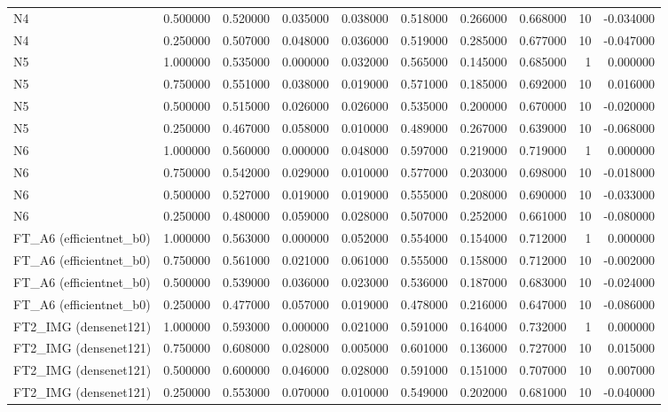 \begin{table}
\begin{tabular}{lrrrrrrrrr}
N4 & 0.500000 & 0.520000 & 0.035000 & 0.038000 & 0.518000 & 0.266000 & 0.668000 & 10 & -0.034000 \\
N4 & 0.250000 & 0.507000 & 0.048000 & 0.036000 & 0.519000 & 0.285000 & 0.677000 & 10 & -0.047000 \\
N5 & 1.000000 & 0.535000 & 0.000000 & 0.032000 & 0.565000 & 0.145000 & 0.685000 & 1 & 0.000000 \\
N5 & 0.750000 & 0.551000 & 0.038000 & 0.019000 & 0.571000 & 0.185000 & 0.692000 & 10 & 0.016000 \\
N5 & 0.500000 & 0.515000 & 0.026000 & 0.026000 & 0.535000 & 0.200000 & 0.670000 & 10 & -0.020000 \\
N5 & 0.250000 & 0.467000 & 0.058000 & 0.010000 & 0.489000 & 0.267000 & 0.639000 & 10 & -0.068000 \\
N6 & 1.000000 & 0.560000 & 0.000000 & 0.048000 & 0.597000 & 0.219000 & 0.719000 & 1 & 0.000000 \\
N6 & 0.750000 & 0.542000 & 0.029000 & 0.010000 & 0.577000 & 0.203000 & 0.698000 & 10 & -0.018000 \\
N6 & 0.500000 & 0.527000 & 0.019000 & 0.019000 & 0.555000 & 0.208000 & 0.690000 & 10 & -0.033000 \\
N6 & 0.250000 & 0.480000 & 0.059000 & 0.028000 & 0.507000 & 0.252000 & 0.661000 & 10 & -0.080000 \\
FT\_A6 (efficientnet\_b0) & 1.000000 & 0.563000 & 0.000000 & 0.052000 & 0.554000 & 0.154000 & 0.712000 & 1 & 0.000000 \\
FT\_A6 (efficientnet\_b0) & 0.750000 & 0.561000 & 0.021000 & 0.061000 & 0.555000 & 0.158000 & 0.712000 & 10 & -0.002000 \\
FT\_A6 (efficientnet\_b0) & 0.500000 & 0.539000 & 0.036000 & 0.023000 & 0.536000 & 0.187000 & 0.683000 & 10 & -0.024000 \\
FT\_A6 (efficientnet\_b0) & 0.250000 & 0.477000 & 0.057000 & 0.019000 & 0.478000 & 0.216000 & 0.647000 & 10 & -0.086000 \\
FT2\_IMG (densenet121) & 1.000000 & 0.593000 & 0.000000 & 0.021000 & 0.591000 & 0.164000 & 0.732000 & 1 & 0.000000 \\
FT2\_IMG (densenet121) & 0.750000 & 0.608000 & 0.028000 & 0.005000 & 0.601000 & 0.136000 & 0.727000 & 10 & 0.015000 \\
FT2\_IMG (densenet121) & 0.500000 & 0.600000 & 0.046000 & 0.028000 & 0.591000 & 0.151000 & 0.707000 & 10 & 0.007000 \\
FT2\_IMG (densenet121) & 0.250000 & 0.553000 & 0.070000 & 0.010000 & 0.549000 & 0.202000 & 0.681000 & 10 & -0.040000 \\

\end{tabular}
\end{table}
